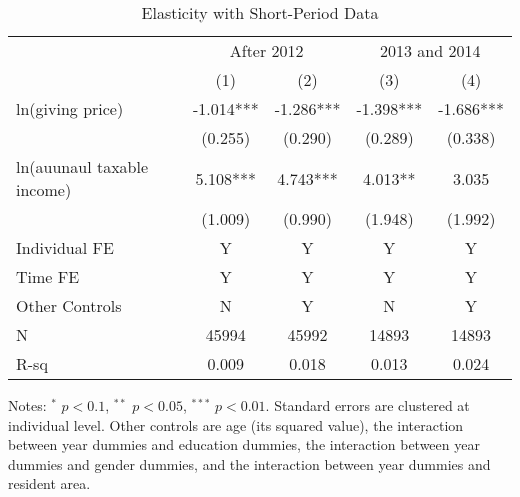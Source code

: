 \documentclass[ review  , 3p ]{elsarticle}
\begin{document}
  \begin{table}
  
  \caption{\label{tab:kableShortElasticity1}Elasticity with Short-Period Data}
  \centering
  \fontsize{8}{10}\selectfont
  \begin{threeparttable}
  \begin{tabular}[t]{lcccc}
  \toprule
  \multicolumn{1}{c}{ } & \multicolumn{2}{c}{After 2012} & \multicolumn{2}{c}{2013 and 2014} \\
  \cmidrule(l{3pt}r{3pt}){2-3} \cmidrule(l{3pt}r{3pt}){4-5}
   & (1) & (2) & (3) & (4)\\
  \midrule
  ln(giving price) & -1.014*** & -1.286*** & -1.398*** & -1.686***\\
   & (0.255) & (0.290) & (0.289) & (0.338)\\
  ln(auunaul taxable income) & 5.108*** & 4.743*** & 4.013** & 3.035\\
   & (1.009) & (0.990) & (1.948) & (1.992)\\
  Individual FE & Y & Y & Y & Y\\
  Time FE & Y & Y & Y & Y\\
  Other Controls & N & Y & N & Y\\
  N & 45994 & 45992 & 14893 & 14893\\
  R-sq & 0.009 & 0.018 & 0.013 & 0.024\\
  \bottomrule
  \end{tabular}
  \begin{tablenotes}
  \item Notes: $^{*}$ $p < 0.1$, $^{**}$ $p < 0.05$, $^{***}$ $p < 0.01$. Standard errors are clustered at individual level. Other controls are age (its squared value), the interaction between year dummies and education dummies, the interaction between year dummies and gender dummies, and the interaction between year dummies and resident area.
  \end{tablenotes}
  \end{threeparttable}
  \end{table}
  
\end{document}
